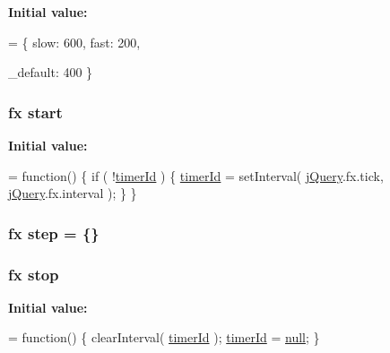 {\bfseries Initial value\+:}
\begin{DoxyCode}
= \{
    slow: 600,
    fast: 200,
    
    \_default: 400
\}
\end{DoxyCode}
\hypertarget{jquery-1_89_81_8js_aef10902ffededd983608fdb8dbfc441a}{
\subsubsection[{start}]{ {\bf fx} start}}\label{jquery-1_89_81_8js_aef10902ffededd983608fdb8dbfc441a}
{\bfseries Initial value\+:}
\begin{DoxyCode}
= \textcolor{keyword}{function}() \{
    \textcolor{keywordflow}{if} ( !\hyperlink{jquery-1_89_81_8js_aa447439fbe7027e58837a297297c9d8a}{timerId} ) \{
        \hyperlink{jquery-1_89_81_8js_aa447439fbe7027e58837a297297c9d8a}{timerId} = setInterval( \hyperlink{jquery-1_89_81_8js_add5237586d970a38a81f990e8eb28c6c}{jQuery}.fx.tick, \hyperlink{jquery-1_89_81_8js_add5237586d970a38a81f990e8eb28c6c}{jQuery}.fx.interval );
    \}
\}
\end{DoxyCode}
\hypertarget{jquery-1_89_81_8js_a7337229078e935a813e7e0f674fad739}{
\subsubsection[{step}]{ {\bf fx} step = \{\}}}\label{jquery-1_89_81_8js_a7337229078e935a813e7e0f674fad739}
\hypertarget{jquery-1_89_81_8js_ac9a544302040b74e845b33c285cd10e7}{
\subsubsection[{stop}]{ {\bf fx} stop}}\label{jquery-1_89_81_8js_ac9a544302040b74e845b33c285cd10e7}
{\bfseries Initial value\+:}
\begin{DoxyCode}
= \textcolor{keyword}{function}() \{
    clearInterval( \hyperlink{jquery-1_89_81_8js_aa447439fbe7027e58837a297297c9d8a}{timerId} );
    \hyperlink{jquery-1_89_81_8js_aa447439fbe7027e58837a297297c9d8a}{timerId} = \hyperlink{validate_8js_afb8e110345c45e74478894341ab6b28e}{null};
\}
\end{DoxyCode}
